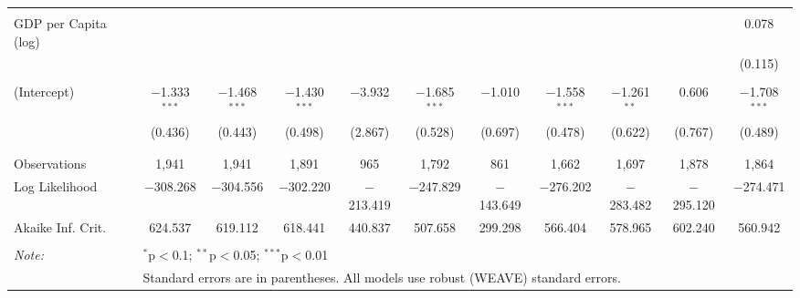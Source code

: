 \documentclass[a4paper]{article}\usepackage[]{graphicx}\usepackage[]{color}
\begin{document}
\begin{table}
\begin{center}
{{\begin{tabular}{@{\extracolsep{5pt}}lcccccccccc}
  & & & & & & & & & & \\ 
 GDP per Capita (log) &  &  &  &  &  &  &  &  &  & 0.078 \\ 
  &  &  &  &  &  &  &  &  &  & (0.115) \\ 
  & & & & & & & & & & \\ 
 (Intercept) & $-$1.333$^{***}$ & $-$1.468$^{***}$ & $-$1.430$^{***}$ & $-$3.932 & $-$1.685$^{***}$ & $-$1.010 & $-$1.558$^{***}$ & $-$1.261$^{**}$ & 0.606 & $-$1.708$^{***}$ \\ 
  & (0.436) & (0.443) & (0.498) & (2.867) & (0.528) & (0.697) & (0.478) & (0.622) & (0.767) & (0.489) \\ 
  & & & & & & & & & & \\ 
\hline \\[-1.8ex] 
Observations & 1,941 & 1,941 & 1,891 & 965 & 1,792 & 861 & 1,662 & 1,697 & 1,878 & 1,864 \\ 
Log Likelihood & $-$308.268 & $-$304.556 & $-$302.220 & $-$213.419 & $-$247.829 & $-$143.649 & $-$276.202 & $-$283.482 & $-$295.120 & $-$274.471 \\ 
Akaike Inf. Crit. & 624.537 & 619.112 & 618.441 & 440.837 & 507.658 & 299.298 & 566.404 & 578.965 & 602.240 & 560.942 \\ 
\hline 
\hline \\[-1.8ex] 
\textit{Note:}  & \multicolumn{10}{l}{$^{*}$p$<$0.1; $^{**}$p$<$0.05; $^{***}$p$<$0.01} \\ 
 & \multicolumn{10}{l}{Standard errors are in parentheses. All models use robust (WEAVE) standard errors.} \\ 
\end{tabular} 

}}
\end{center}

\end{table}
\end{document}
